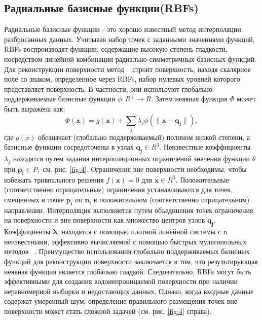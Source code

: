 \subsection{Радиальные базисные функции(RBFs)}
Радиальные базисные функции - это хорошо известный метод интерполяции разбросанных данных. Учитывая набор точек с заданными значениями функций, RBFs воспроизводят функции, содержащие высокую степень гладкости, посредством линейной комбинации радиально-симметричных базисных функций. Для реконструкции поверхности метод ~\cite{CARR} строит поверхность, находя скалярное поле со знаком, определенное через RBFs, набор нулевых уровней которого представляет поверхность. В частности, они используют глобально поддерживаемые базисные функции $\phi : R^{+} \rightarrow R$. Затем неявная функция $\Phi$ может быть выражена как:
$$\Phi(\mathbf{x}) = g(\mathbf{x}) + \sum_j\lambda_j\phi(\parallel \mathbf{x} - \mathbf{q_j} \parallel), $$
где $g(x)$ обозначает (глобально поддерживаемый) полином низкой степени, а базисные функции сосредоточены в узлах $\mathbf{q_j} \in R^{3} $. Неизвестные коэффициенты $λ_j$ находятся путем задания интерполяционных ограничений значения функции $\theta$ при $\mathbf{p_i} \in P;$ см. рис. \ref{fig:4}. Ограничения вне поверхности необходимы, чтобы избежать тривиального решения $f (\mathbf{x}) = 0$ для $\mathbf{x} \in R^{3}$. Положительные (соответственно отрицательные) ограничения устанавливаются для точек, смещенных в точке $\mathbf{p_i}$ по $\mathbf{n_i}$ в положительном (соответственно отрицательном) направлении. Интерполяция выполняется путем объединения точек ограничения на поверхности и вне поверхности как множество центров узлов $\mathbf{q_{j}} $. Коэффициенты $\mathbf{λ_i}$ находятся с помощью плотной линейной системы с n неизвестными, эффективно вычисляемой с помощью быстрых мультипольных методов ~\cite{CARR}. Преимущество использования глобально поддерживаемых базисных функций для реконструкции поверхности заключается в том, что результирующая неявная функция является глобально гладкой. Следовательно, RBFs могут быть эффективными для создания водонепроницаемой поверхности при наличии неравномерной выборки и недостающих данных. Однако, когда входные данные содержат умеренный шум, определение правильного размещения точек вне поверхности может стать сложной задачей (см. рис. \ref{fig:4} справа). 

